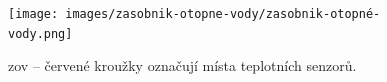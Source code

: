 
\begin{figure}[H]
    \centering
    \texttt{[image: images/zasobnik-otopne-vody/zasobnik-otopné-vody.png]}
    \caption[Zásobník otopné vody.]{\acrshort{zov} – červené kroužky označují místa teplotních senzorů.}
    \label{fig:zasobnik-otopné-vody}
\end{figure}